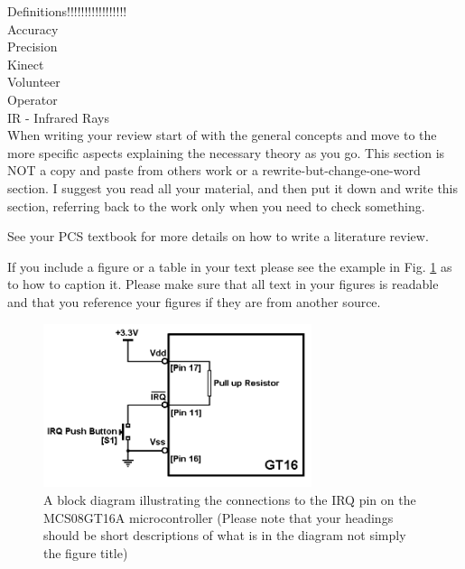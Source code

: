 Definitions!!!!!!!!!!!!!!!!!\\
Accuracy\\
Precision\\
Kinect\\
Volunteer\\
Operator\\
IR - Infrared Rays\\


When writing your review start of with the general concepts and move to the more specific aspects
explaining the necessary theory as you go. This section is NOT a copy and paste from others work or a
rewrite-but-change-one-word section. I suggest you read all your material, and then put it down and
write this section, referring back to the work only when you need to check something.

See your PCS textbook for more details on how to write a literature review.

If you include a figure or a table in your text please see the example in Fig. \ref{fig:model} as to how to caption it.
Please make sure that all text in your figures is readable and that you reference your figures if they are
from another source.

\begin{figure}[ht]
\centering
\includegraphics[width=0.7\textwidth]{model.png}
\caption{A block diagram illustrating the connections to the IRQ pin on the MCS08GT16A microcontroller (Please
note that your headings should be short descriptions of what is in the diagram not simply the figure title)}
\label{fig:model}
\end{figure}

